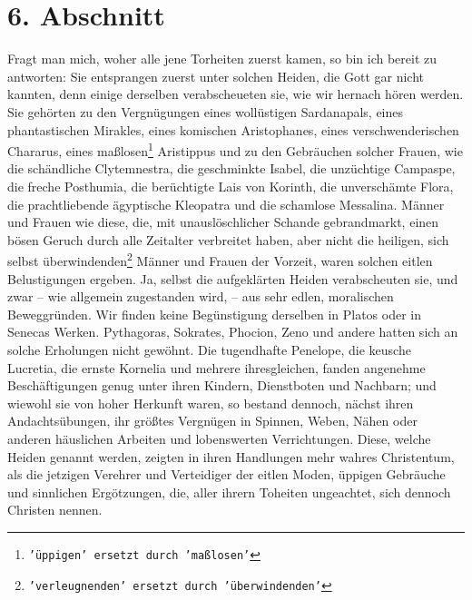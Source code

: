 \section{6. Abschnitt} \label{kap17_ab6}

Fragt man mich, woher alle jene Torheiten zuerst kamen, so bin ich bereit zu
antworten: Sie entsprangen zuerst unter solchen Heiden, die Gott gar nicht
kannten, denn einige derselben verabscheueten sie, wie wir hernach hören werden.
Sie gehörten zu den Vergnügungen eines wollüstigen
Sardanapals, eines
phantastischen Mirakles, eines komischen
Aristophanes, eines verschwenderischen
Chararus, eines maßlosen\footnote{\texttt{'üppigen'
ersetzt durch 'maßlosen'}}
Aristippus und zu den Gebräuchen solcher Frauen, wie
die
schändliche Clytemnestra, die geschminkte
Isabel, die unzüchtige
Campaspe, die
freche Posthumia, die berüchtigte Lais von
Korinth, die unverschämte Flora, die
prachtliebende ägyptische Kleopatra und die schamlose
Messalina. Männer und
Frauen wie diese, die, mit unauslöschlicher Schande gebrandmarkt, einen bösen
Geruch durch alle Zeitalter verbreitet haben, aber nicht die heiligen, sich
selbst überwindenden\footnote{\texttt{'verleugnenden' ersetzt durch
'überwindenden'}} Männer und
Frauen der Vorzeit, waren solchen eitlen
Belustigungen ergeben. Ja, selbst die aufgeklärten
Heiden verabscheuten sie,
und zwar -- wie allgemein zugestanden wird, -- aus sehr edlen, moralischen
Beweggründen. Wir finden keine Begünstigung derselben in
Platos oder in
Senecas Werken. Pythagoras,
Sokrates, Phocion,
Zeno und andere hatten sich an
solche Erholungen nicht gewöhnt. Die tugendhafte
Penelope, die keusche
Lucretia, die ernste
Kornelia und mehrere ihresgleichen, fanden angenehme
Beschäftigungen genug unter ihren Kindern, Dienstboten und Nachbarn; und wiewohl
sie von hoher Herkunft waren, so bestand dennoch, nächst ihren Andachtsübungen,
ihr größtes Vergnügen in Spinnen, Weben, Nähen oder anderen häuslichen Arbeiten
und lobenswerten Verrichtungen. Diese, welche Heiden genannt werden, zeigten
in ihren Handlungen mehr wahres Christentum, als die jetzigen Verehrer und
Verteidiger der eitlen Moden, üppigen Gebräuche und sinnlichen Ergötzungen,
die, aller ihrern Toheiten ungeachtet, sich dennoch Christen nennen.

